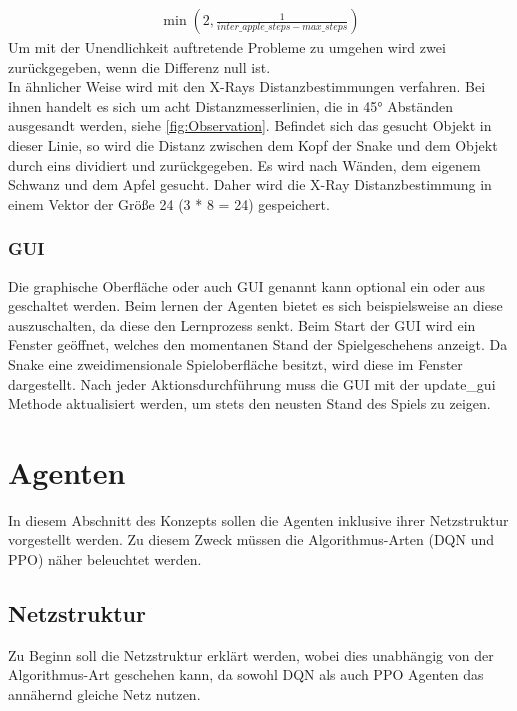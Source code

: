 \begin{align}
	\min(2, \frac{1}{inter\_apple\_steps - max\_steps})
\end{align}
Um mit der Unendlichkeit auftretende Probleme zu umgehen wird zwei zurückgegeben, wenn die Differenz null ist.\\
In ähnlicher Weise wird mit den X-Rays Distanzbestimmungen verfahren. Bei ihnen handelt es sich um acht Distanzmesserlinien, die in 45° Abständen ausgesandt werden, siehe \ref{fig:Observation}. Befindet sich das gesucht Objekt in dieser Linie, so wird die Distanz zwischen dem Kopf der Snake und dem Objekt durch eins dividiert und zurückgegeben. Es wird nach Wänden, dem eigenem Schwanz und dem Apfel gesucht. Daher wird die X-Ray Distanzbestimmung in einem Vektor der Größe 24 (3 * 8 = 24) gespeichert.

\subsubsection{GUI}
Die graphische Oberfläche oder auch GUI genannt kann optional ein oder aus geschaltet werden. Beim lernen der Agenten bietet es sich beispielsweise an diese auszuschalten, da diese den Lernprozess senkt. Beim Start der GUI wird ein Fenster geöffnet, welches den momentanen Stand der Spielgeschehens anzeigt. Da Snake eine zweidimensionale Spieloberfläche besitzt, wird diese im Fenster dargestellt. Nach jeder Aktionsdurchführung muss die GUI mit der update\_gui Methode aktualisiert werden, um stets den neusten Stand des Spiels zu zeigen.

\section{Agenten} \label{sec:Konzept_Agenten}
In diesem Abschnitt des Konzepts sollen die Agenten inklusive ihrer Netzstruktur vorgestellt werden. Zu diesem Zweck müssen die Algorithmus-Arten (DQN und PPO) näher beleuchtet werden.

\subsection{Netzstruktur} \label{sec:Konzept_Netzstruktur}
Zu Beginn soll die Netzstruktur erklärt werden, wobei dies unabhängig von der Algorithmus-Art geschehen kann, da sowohl DQN als auch PPO Agenten das annähernd gleiche Netz nutzen.

